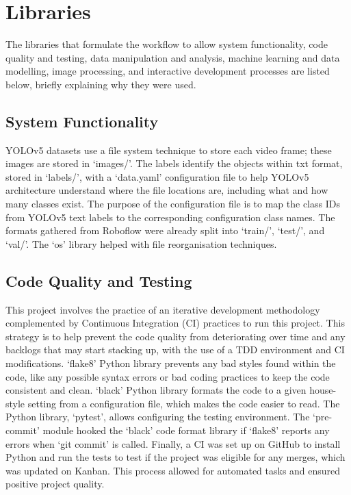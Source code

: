 \documentclass[12pt]{report} %
\begin{document}
	\section{Libraries}
		The libraries that formulate the workflow to allow system functionality, code quality and testing, data manipulation and analysis, machine learning and data modelling, image processing, and interactive development processes are listed below, briefly explaining why they were used.

		\subsection*{System Functionality}
			YOLOv5 datasets use a file system technique to store each video frame; these images are stored in `images/'. The labels identify the objects within txt format, stored in `labels/', with a `data.yaml' configuration file to help YOLOv5 architecture understand where the file locations are, including what and how many classes exist. The purpose of the configuration file is to map the class IDs from YOLOv5 text labels to the corresponding configuration class names. The formats gathered from Roboflow were already split into `train/', `test/', and `val/'. The `os' library helped with file reorganisation techniques.

		\subsection*{Code Quality and Testing}
			This project involves the practice of an iterative development methodology complemented by Continuous Integration (CI) practices to run this project. This strategy is to help prevent the code quality from deteriorating over time and any backlogs that may start stacking up, with the use of a TDD environment and CI modifications. `flake8' Python library prevents any bad styles found within the code, like any possible syntax errors or bad coding practices to keep the code consistent and clean. `black' Python library formats the code to a given house-style setting from a configuration file, which makes the code easier to read. The Python library, `pytest', allows configuring the testing environment. The `pre-commit' module hooked the `black' code format library if `flake8' reports any errors when `git commit' is called. Finally, a CI was set up on GitHub to install Python and run the tests to test if the project was eligible for any merges, which was updated on Kanban. This process allowed for automated tasks and ensured positive project quality.
		
\end{document}

